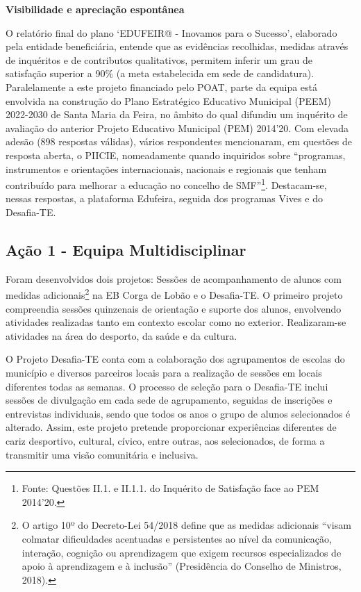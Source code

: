 \documentclass[
]{book}
\begin{document}
\textbf{Visibilidade e apreciação espontânea}

O relatório final do plano `EDUFEIR@ - Inovamos para o Sucesso', elaborado pela entidade beneficiária, entende que as evidências recolhidas, medidas através de inquéritos e de contributos qualitativos, permitem inferir um grau de satisfação superior a 90\% (a meta estabelecida em sede de candidatura). Paralelamente a este projeto financiado pelo POAT, parte da equipa está envolvida na construção do Plano Estratégico Educativo Municipal (PEEM) 2022-2030 de Santa Maria da Feira, no âmbito do qual difundiu um inquérito de avaliação do anterior Projeto Educativo Municipal (PEM) 2014'20. Com elevada adesão (898 respostas válidas), vários respondentes mencionaram, em questões de resposta aberta, o PIICIE, nomeadamente quando inquiridos sobre ``programas, instrumentos e orientações internacionais, nacionais e regionais que tenham contribuído para melhorar a educação no concelho de SMF''\footnote{Fonte: Questões II.1. e II.1.1. do Inquérito de Satisfação face ao PEM 2014'20.}. Destacam-se, nessas respostas, a plataforma Edufeira, seguida dos programas Vives e do Desafia-TE.

\hypertarget{auxe7uxe3o-1---equipa-multidisciplinar}{%
\subsection{\texorpdfstring{\textbf{Ação 1 - Equipa Multidisciplinar}}{Ação 1 - Equipa Multidisciplinar}}\label{auxe7uxe3o-1---equipa-multidisciplinar}}

Foram desenvolvidos dois projetos: Sessões de acompanhamento de alunos com medidas adicionais\footnote{O artigo 10º do Decreto-Lei 54/2018 define que as medidas adicionais ``visam colmatar dificuldades acentuadas e persistentes ao nível da comunicação, interação, cognição ou aprendizagem que exigem recursos especializados de apoio à aprendizagem e à inclusão'' (Presidência do Conselho de Ministros, 2018).} na EB Corga de Lobão e o Desafia-TE. O primeiro projeto compreendia sessões quinzenais de orientação e suporte dos alunos, envolvendo atividades realizadas tanto em contexto escolar como no exterior. Realizaram-se atividades na área do desporto, da saúde e da cultura.

O Projeto Desafia-TE conta com a colaboração dos agrupamentos de escolas do município e diversos parceiros locais para a realização de sessões em locais diferentes todas as semanas. O processo de seleção para o Desafia-TE inclui sessões de divulgação em cada sede de agrupamento, seguidas de inscrições e entrevistas individuais, sendo que todos os anos o grupo de alunos selecionados é alterado. Assim, este projeto pretende proporcionar experiências diferentes de cariz desportivo, cultural, cívico, entre outras, aos selecionados, de forma a transmitir uma visão comunitária e inclusiva.
\end{document}
